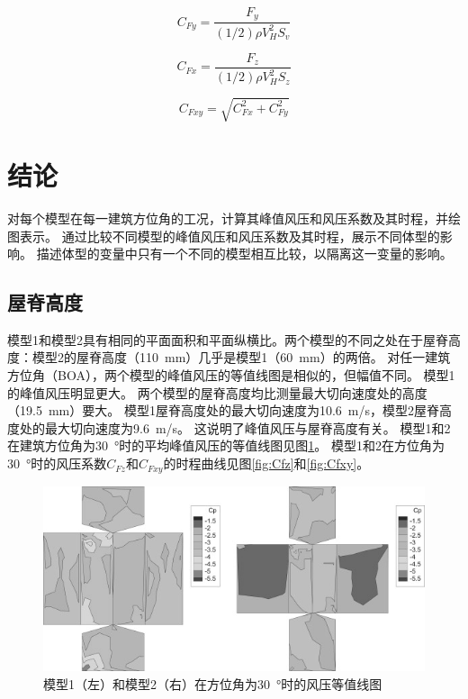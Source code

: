 \documentclass{ctexart}
\begin{document}
\begin{equation}
	C_{Fy}=\frac{F_y}{(1/2)\rho V_H^2 S_v}
\end{equation}

\begin{equation}
	C_{Fx}=\frac{F_z}{(1/2)\rho V_H^2 S_z}
\end{equation}

\begin{equation}
	C_{Fxy}=\sqrt{C_{Fx}^2+C_{Fy}^2}
\end{equation}

\section{结论}
对每个模型在每一建筑方位角的工况，计算其峰值风压和风压系数及其时程，并绘图表示。
通过比较不同模型的峰值风压和风压系数及其时程，展示不同体型的影响。
描述体型的变量中只有一个不同的模型相互比较，以隔离这一变量的影响。

\subsection{屋脊高度}
模型1和模型2具有相同的平面面积和平面纵横比。两个模型的不同之处在于屋脊高度：模型2的屋脊高度（\SI{110}{mm}）几乎是模型1（\SI{60}{mm}）的两倍。
对任一建筑方位角（BOA），两个模型的峰值风压的等值线图是相似的，但幅值不同。
模型1的峰值风压明显更大。
两个模型的屋脊高度均比测量最大切向速度处的高度（\SI{19.5}{mm}）要大。
模型1屋脊高度处的最大切向速度为\SI{10.6}{m/s}，模型2屋脊高度处的最大切向速度为\SI{9.6}{m/s}。
这说明了峰值风压与屋脊高度有关。
模型1和2在建筑方位角为\SI{30}{\degree}时的平均峰值风压的等值线图见图\ref{fig:ppc}。
模型1和2在方位角为\SI{30}{\degree}时的风压系数$C_{Fz}$和$C_{Fxy}$的时程曲线见图\ref{fig:Cfz}和\ref{fig:Cfxy}。
\begin{figure}[h]
\centering
\includegraphics{./fig/4.jpg}
\caption{模型1（左）和模型2（右）在方位角为\SI{30}{\degree}时的风压等值线图}
\label{fig:ppc}
\end{figure}
\end{document}
